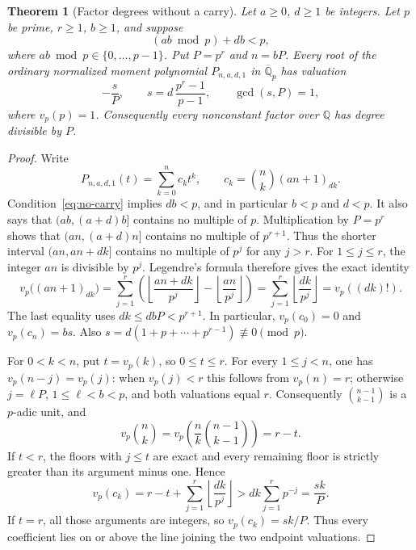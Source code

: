 \documentclass[11pt]{article}
\newtheorem{theorem}{Theorem}
\theoremstyle{remark}
\newcommand{\Q}{\mathbb Q}
\newcommand{\vp}{v_p}
\begin{document}
\begin{theorem}[Factor degrees without a carry]\label{thm:factor-degrees}
Let $a\ge0$, $d\ge1$ be integers. Let $p$ be prime, $r\ge1$, $b\ge1$,
and suppose
\begin{equation}\label{eq:no-carry}
 (ab\bmod p)+db<p,
\end{equation}
where $ab\bmod p\in\{0,\ldots,p-1\}$. Put $P=p^r$ and $n=bP$.
Every root of the ordinary normalized moment polynomial $P_{n,a,d,1}$
in $\overline{\Q}_p$ has valuation
\begin{equation}\label{eq:root-valuation}
 -\frac{s}{P},\qquad
 s=d\,\frac{p^r-1}{p-1},\qquad \gcd(s,P)=1,
\end{equation}
where $\vp(p)=1$. Consequently every nonconstant factor over $\Q$
has degree divisible by $P$.
\end{theorem}
\begin{proof}
Write
\[
 P_{n,a,d,1}(t)=\sum_{k=0}^n c_kt^k,\qquad
 c_k=\binom nk(an+1)_{dk}.
\]
Condition~\eqref{eq:no-carry} implies $db<p$, and in particular
$b<p$ and $d<p$. It also says that $(ab,(a+d)b]$ contains no
multiple of $p$. Multiplication by $P=p^r$ shows that
$(an,(a+d)n]$ contains no multiple of $p^{r+1}$. Thus the shorter
interval $(an,an+dk]$ contains no multiple of $p^j$ for any $j>r$.
For $1\le j\le r$, the integer $an$ is divisible by $p^j$.
Legendre's formula therefore gives the exact identity
\begin{equation}\label{eq:shifted-valuation}
 \vp\bigl((an+1)_{dk}\bigr)
 =\sum_{j=1}^r\left(
     \left\lfloor\frac{an+dk}{p^j}\right\rfloor
       -\left\lfloor\frac{an}{p^j}\right\rfloor\right)
 =\sum_{j=1}^r\left\lfloor\frac{dk}{p^j}\right\rfloor
 =\vp((dk)!).
\end{equation}
The last equality uses $dk\le dbP<p^{r+1}$.
In particular, $\vp(c_0)=0$ and $\vp(c_n)=bs$.
Also $s=d(1+p+\cdots+p^{r-1})\not\equiv0\pmod p$.

For $0<k<n$, put $t=\vp(k)$, so $0\le t\le r$.
For every $1\le j<n$, one has $\vp(n-j)=\vp(j)$:
when $\vp(j)<r$ this follows from $\vp(n)=r$; otherwise
$j=\ell P$, $1\le\ell<b<p$, and both valuations equal $r$.
Consequently $\binom{n-1}{k-1}$ is a $p$-adic unit, and
\[
 \vp\binom nk=\vp\left(\frac nk\binom{n-1}{k-1}\right)=r-t.
\]
If $t<r$, the floors with $j\le t$ are exact and every remaining
floor is strictly greater than its argument minus one. Hence
\begin{equation}\label{eq:strict-chord}
 \vp(c_k)
 =r-t+\sum_{j=1}^r\left\lfloor\frac{dk}{p^j}\right\rfloor
 >dk\sum_{j=1}^r p^{-j}
 =\frac{sk}{P}.
\end{equation}
If $t=r$, all those arguments are integers, so
$\vp(c_k)=sk/P$. Thus every coefficient lies on or above the line
joining the two endpoint valuations.


\end{proof}
\end{document}
